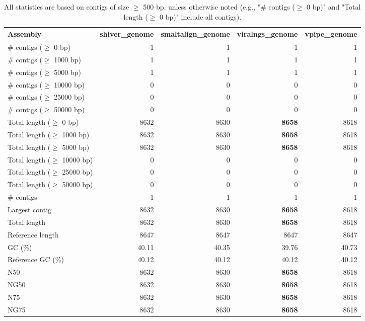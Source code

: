 \documentclass[12pt,a4paper]{article}
\begin{document}
\begin{table}[ht]
\begin{center}
\caption{All statistics are based on contigs of size $\geq$ 500 bp, unless otherwise noted (e.g., "\# contigs ($\geq$ 0 bp)" and "Total length ($\geq$ 0 bp)" include all contigs).}
\begin{tabular}{|l*{4}{|r}|}
\hline
Assembly & shiver\_genome & smaltalign\_genome & viralngs\_genome & vpipe\_genome \\ \hline
\# contigs ($\geq$ 0 bp) & 1 & 1 & 1 & 1 \\ \hline
\# contigs ($\geq$ 1000 bp) & 1 & 1 & 1 & 1 \\ \hline
\# contigs ($\geq$ 5000 bp) & 1 & 1 & 1 & 1 \\ \hline
\# contigs ($\geq$ 10000 bp) & 0 & 0 & 0 & 0 \\ \hline
\# contigs ($\geq$ 25000 bp) & 0 & 0 & 0 & 0 \\ \hline
\# contigs ($\geq$ 50000 bp) & 0 & 0 & 0 & 0 \\ \hline
Total length ($\geq$ 0 bp) & 8632 & 8630 & {\bf 8658} & 8618 \\ \hline
Total length ($\geq$ 1000 bp) & 8632 & 8630 & {\bf 8658} & 8618 \\ \hline
Total length ($\geq$ 5000 bp) & 8632 & 8630 & {\bf 8658} & 8618 \\ \hline
Total length ($\geq$ 10000 bp) & 0 & 0 & 0 & 0 \\ \hline
Total length ($\geq$ 25000 bp) & 0 & 0 & 0 & 0 \\ \hline
Total length ($\geq$ 50000 bp) & 0 & 0 & 0 & 0 \\ \hline
\# contigs & 1 & 1 & 1 & 1 \\ \hline
Largest contig & 8632 & 8630 & {\bf 8658} & 8618 \\ \hline
Total length & 8632 & 8630 & {\bf 8658} & 8618 \\ \hline
Reference length & 8647 & 8647 & 8647 & 8647 \\ \hline
GC (\%) & 40.11 & 40.35 & 39.76 & 40.73 \\ \hline
Reference GC (\%) & 40.12 & 40.12 & 40.12 & 40.12 \\ \hline
N50 & 8632 & 8630 & {\bf 8658} & 8618 \\ \hline
NG50 & 8632 & 8630 & {\bf 8658} & 8618 \\ \hline
N75 & 8632 & 8630 & {\bf 8658} & 8618 \\ \hline
NG75 & 8632 & 8630 & {\bf 8658} & 8618 \\ \hline

\end{tabular}
\end{center}
\end{table}
\end{document}

